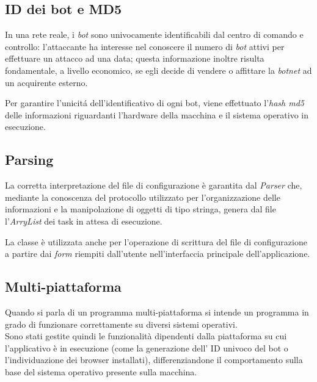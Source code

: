 \vspace*{0.5cm}
\subsection{ID dei bot e MD5}
In una rete reale, i \textit{bot} sono univocamente identificabili dal centro di comando e controllo:
l'attaccante ha interesse nel conoscere il numero di \textit{bot} attivi per effettuare un attacco ad una data; questa informazione inoltre risulta fondamentale, a livello economico, se egli decide di vendere o affittare la \textit{botnet} ad un acquirente esterno. 

Per garantire l'unicit\'a dell'identificativo di ogni bot, viene effettuato l'\textit{hash md5} delle informazioni riguardanti l'hardware della macchina e il sistema operativo in esecuzione.

\vspace*{0.5cm}
\subsection{Parsing}
La corretta interpretazione del file di configurazione \`{e} garantita dal \textit{Parser} che, mediante la conoscenza del protocollo utilizzato per l'organizzazione delle informazioni e la manipolazione di oggetti di tipo stringa, genera dal file l'\textit{ArryList} dei task in attesa di esecuzione. 

La classe \`{e} utilizzata anche per l'operazione di scrittura del file di configurazione a partire dai \textit{form} riempiti dall'utente nell'interfaccia principale dell'applicazione.

\vspace*{0.5cm}
\subsection{Multi-piattaforma}
Quando si parla di un programma multi-piattaforma si intende un programma in grado di funzionare correttamente su diversi sistemi operativi.\\
Sono stati gestite quindi le funzionalit\`{a} dipendenti dalla piattaforma su cui l'applicativo \`{e} in esecuzione (come la generazione dell' ID univoco del bot o l'individuazione dei browser installati), differenziandone il comportamento sulla base del sistema operativo presente sulla macchina.

\vspace*{0.5cm}
